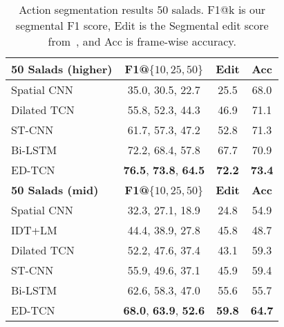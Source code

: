 \documentclass[10pt,twocolumn,letterpaper]{article}
\begin{document}
\begin{table}
\centering
\begin{tabular}{| l | c | c | c |}
			\hline
			\textbf{50 Salads (higher)} & \textbf{F1@$\{10,25,50\}$} & \textbf{Edit} & \textbf{Acc} \\
			\hline
Spatial CNN~\cite{lea_eccv_2016} & 35.0, 30.5, 22.7 &  25.5  & 68.0 \\
            Dilated TCN & 55.8, 52.3, 44.3 & 46.9 & 71.1 \\
			ST-CNN~\cite{lea_eccv_2016} & 61.7, 57.3, 47.2 & 52.8 & 71.3 \\
			Bi-LSTM & 72.2, 68.4, 57.8 & 67.7 & 70.9 \\            
            
ED-TCN & \textbf{76.5}, \textbf{73.8}, \textbf{64.5} & \textbf{72.2} & \textbf{73.4}\\            
\hline
            \textbf{50 Salads (mid)} & \textbf{F1@$\{10,25,50\}$} & \textbf{Edit} & \textbf{Acc} \\
            \hline
            Spatial CNN~\cite{lea_eccv_2016} & 32.3, 27.1, 18.9 & 24.8 & 54.9 \\
            IDT+LM~\cite{richard_cvpr_2016} & 44.4, 38.9, 27.8 & 45.8 & 48.7\\
            Dilated TCN  & 52.2, 47.6, 37.4 & 43.1 & 59.3 \\
ST-CNN \cite{lea_eccv_2016} & 55.9, 49.6, 37.1 & 45.9 & 59.4\\
            Bi-LSTM & 62.6, 58.3, 47.0 & 55.6 & 55.7 \\ 
ED-TCN & \textbf{68.0}, \textbf{63.9}, \textbf{52.6} & \textbf{59.8} & \textbf{64.7} \\
			\hline            
		\end{tabular}
        \label{tab:50salads}
        \caption{Action segmentation results 50 salads.
        F1@k is our segmental F1 score, Edit is the Segmental edit score from~\cite{lea_icra_2016}, and Acc is frame-wise accuracy. 
        }
\end{table}
\end{document}
